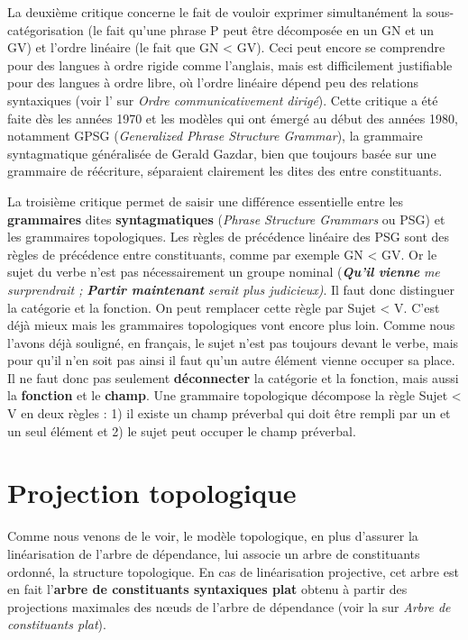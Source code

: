 {    La deuxième critique concerne le fait de vouloir exprimer simultanément la sous-catégorisation (le fait qu’une phrase P peut être décomposée en un GN et un GV) et l’ordre linéaire (le fait que GN < GV). Ceci peut encore se comprendre pour des langues à ordre rigide comme l’anglais, mais est difficilement justifiable pour des langues à ordre libre, où l’ordre linéaire dépend peu des relations syntaxiques (voir l’ sur \textit{Ordre communicativement dirigé}). Cette critique a été faite dès les années 1970 et les modèles qui ont émergé au début des années 1980, notamment GPSG (\textit{Generalized Phrase Structure Grammar}), la grammaire syntagmatique généralisée de Gerald Gazdar, bien que toujours basée sur une grammaire de réécriture, séparaient clairement les dites des  entre constituants.

    La troisième critique permet de saisir une différence essentielle entre les \textbf{grammaires} dites \textbf{syntagmatiques} (\textit{Phrase Structure Grammars} ou PSG) et les grammaires topologiques. Les règles de précédence linéaire des PSG sont des règles de précédence entre constituants, comme par exemple GN < GV. Or le sujet du verbe n’est pas nécessairement un groupe nominal (\textbf{\textit{Qu’il} \textit{vienne}} \textit{me surprendrait ;} \textbf{\textit{Partir maintenant}} \textit{serait plus judicieux)}. Il faut donc distinguer la catégorie et la fonction. On peut remplacer cette règle par Sujet < V. C’est déjà mieux mais les grammaires topologiques vont encore plus loin. Comme nous l’avons déjà souligné, en français, le sujet n’est pas toujours devant le verbe, mais pour qu’il n’en soit pas ainsi il faut qu’un autre élément vienne occuper sa place. Il ne faut donc pas seulement \textbf{déconnecter} la catégorie et la fonction, mais aussi la \textbf{fonction} et le \textbf{champ}. Une grammaire topologique décompose la règle Sujet < V en deux règles : 1) il existe un champ préverbal qui doit être rempli par un et un seul élément et 2) le sujet peut occuper le champ préverbal.
}
\section{Projection topologique}\label{sec:3.5.30}

Comme nous venons de le voir, le modèle topologique, en plus d’assurer la linéarisation de l’arbre de dépendance, lui associe un arbre de constituants ordonné, la structure topologique. En cas de linéarisation projective, cet arbre est en fait l’\textbf{arbre de constituants syntaxiques plat} obtenu à partir des projections maximales des nœuds de l’arbre de dépendance (voir la  sur \textit{Arbre de constituants plat}).

